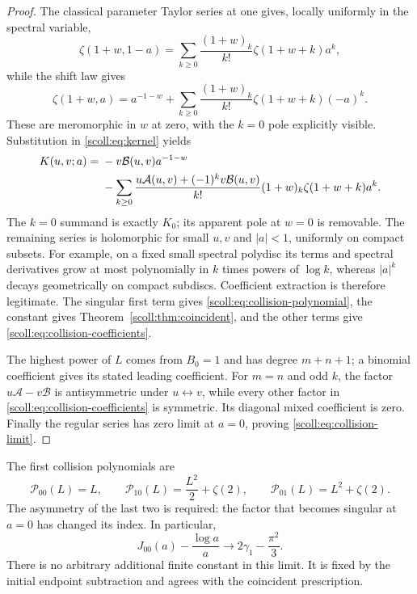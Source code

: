 \begin{proof}
The classical parameter Taylor series at one gives, locally uniformly
in the spectral variable,
\[
 \zeta(1+w,1-a)=\sum_{k\ge0}\frac{(1+w)_k}{k!}
                      \zeta(1+w+k)a^k,
\]
while the shift law gives
\[
 \zeta(1+w,a)=a^{-1-w}
        +\sum_{k\ge0}\frac{(1+w)_k}{k!}\zeta(1+w+k)(-a)^k.
\]
These are meromorphic in $w$ at zero, with the $k=0$ pole explicitly
visible. Substitution in \eqref{scoll:eq:kernel} yields
\begin{align}
 K(u,v;a)={}&-v\mathcal B(u,v)a^{-1-w}\notag\\
 &-\sum_{k\ge0}\frac{u\mathcal A(u,v)+(-1)^kv\mathcal B(u,v)}{k!}
                      (1+w)_k\zeta(1+w+k)a^k.
 \label{scoll:eq:K-collision}
\end{align}
The $k=0$ summand is exactly $K_0$; its apparent pole at $w=0$ is
removable. The remaining series is holomorphic for small $u,v$ and
$|a|<1$, uniformly on compact subsets. For example, on a fixed small
spectral polydisc its terms and spectral derivatives grow at most
polynomially in $k$ times powers of $\log k$, whereas $|a|^k$ decays
geometrically on compact subdiscs. Coefficient extraction is therefore
legitimate. The singular first term gives
\eqref{scoll:eq:collision-polynomial}, the constant gives
Theorem~\ref{scoll:thm:coincident}, and the other terms give
\eqref{scoll:eq:collision-coefficients}.

The highest power of $L$ comes from $B_0=1$ and has degree $m+n+1$;
a binomial coefficient gives its stated leading coefficient.
For $m=n$ and odd $k$, the factor
$u\mathcal A-v\mathcal B$ is antisymmetric under $u\leftrightarrow v$, while every other
factor in \eqref{scoll:eq:collision-coefficients} is symmetric. Its diagonal
mixed coefficient is zero. Finally the regular series has zero limit
at $a=0$, proving \eqref{scoll:eq:collision-limit}.
\end{proof}

The first collision polynomials are
\begin{equation}
 \mathcal P_{00}(L)=L,\qquad
 \mathcal P_{10}(L)=\frac{L^2}{2}+\zeta(2),\qquad
 \mathcal P_{01}(L)=L^2+\zeta(2).
 \label{scoll:eq:collision-examples}
\end{equation}
The asymmetry of the last two is required: the factor that becomes
singular at $a=0$ has changed its index. In particular,
\[
 J_{00}(a)-\frac{\log a}{a}\longrightarrow
                   2\gamma_1-\frac{\pi^2}{3}.
\]
There is no arbitrary additional finite constant in this limit. It is
fixed by the initial endpoint subtraction and agrees with the coincident
prescription.


